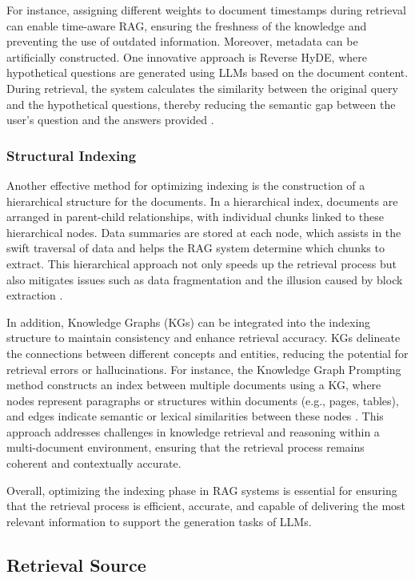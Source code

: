 For instance, assigning different weights to document timestamps during retrieval can enable time-aware RAG, ensuring the freshness of the knowledge and preventing the use of outdated information. Moreover, metadata can be artificially constructed. One innovative approach is Reverse HyDE, where hypothetical questions are generated using LLMs based on the document content. During retrieval, the system calculates the similarity between the original query and the hypothetical questions, thereby reducing the semantic gap between the user's question and the answers provided \cite{gao2023retrieval}.

\subsubsection{Structural Indexing}

Another effective method for optimizing indexing is the construction of a hierarchical structure for the documents. In a hierarchical index, documents are arranged in parent-child relationships, with individual chunks linked to these hierarchical nodes. Data summaries are stored at each node, which assists in the swift traversal of data and helps the RAG system determine which chunks to extract. This hierarchical approach not only speeds up the retrieval process but also mitigates issues such as data fragmentation and the illusion caused by block extraction \cite{gao2023retrieval}.

In addition, Knowledge Graphs (KGs) can be integrated into the indexing structure to maintain consistency and enhance retrieval accuracy. KGs delineate the connections between different concepts and entities, reducing the potential for retrieval errors or hallucinations. For instance, the Knowledge Graph Prompting method constructs an index between multiple documents using a KG, where nodes represent paragraphs or structures within documents (e.g., pages, tables), and edges indicate semantic or lexical similarities between these nodes \cite{wang2024knowledge}. This approach addresses challenges in knowledge retrieval and reasoning within a multi-document environment, ensuring that the retrieval process remains coherent and contextually accurate.

Overall, optimizing the indexing phase in RAG systems is essential for ensuring that the retrieval process is efficient, accurate, and capable of delivering the most relevant information to support the generation tasks of LLMs.

\subsection{Retrieval Source}

